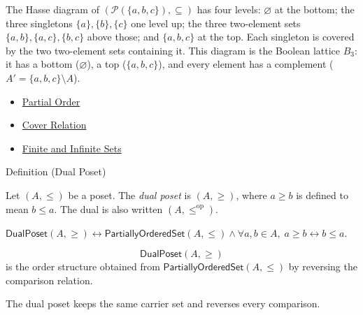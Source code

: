 \begin{remark*}[Examples]
The Hasse diagram of $(\mathcal{P}(\{a,b,c\}), \subseteq)$ has four levels:
$\varnothing$ at the bottom; the three singletons $\{a\},\{b\},\{c\}$ one
level up; the three two-element sets $\{a,b\},\{a,c\},\{b,c\}$ above those;
and $\{a,b,c\}$ at the top.  Each singleton is covered by the two two-element
sets containing it.  This diagram is the Boolean lattice $B_3$: it has a
bottom ($\varnothing$), a top ($\{a,b,c\}$), and every element has a complement
($A' = \{a,b,c\} \setminus A$).
\end{remark*}

\begin{dependencies}
\begin{itemize}
  \item \hyperref[def:partial-order]{Partial Order}
  \item \hyperref[def:cover-relation]{Cover Relation}
  \item \hyperref[def:finite-infinite]{Finite and Infinite Sets}
\end{itemize}
\end{dependencies}


\begin{definitionbox}{Definition (Dual Poset)}
\begin{definition}\label{def:dual-poset}
Let $(A, \leq)$ be a poset.  The \emph{dual poset} is $(A, \geq)$, where
$a \geq b$ is defined to mean $b \leq a$.  The dual is also written
$(A, \leq^{\mathrm{op}})$.
\end{definition}
\end{definitionbox}

\begin{remark*}
$\mathsf{DualPoset}(A,\geq)\leftrightarrow
\mathsf{PartiallyOrderedSet}(A,\leq)\wedge
\forall a,b\in A,\;a\geq b\leftrightarrow b\leq a$.
\end{remark*}

\begin{remark*}
\[
  \mathsf{DualPoset}(A,\geq)
\] is the order structure obtained from
$\mathsf{PartiallyOrderedSet}(A,\leq)$ by reversing the comparison relation.
\end{remark*}

\begin{remark*}[Interpretation]
The dual poset keeps the same carrier set and reverses every comparison.
\end{remark*}

